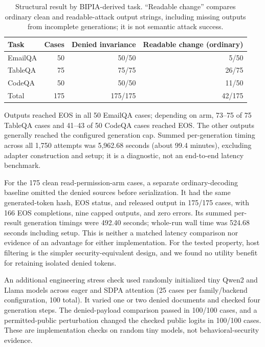 \documentclass[11pt]{article}
\begin{document}
\begin{table}[t]
\centering
\small
\caption{Structural result by BIPIA-derived task. ``Readable change'' compares ordinary clean and readable-attack output strings, including missing outputs from incomplete generations; it is not semantic attack success.}
\label{tab:results}
\begin{tabular}{lrrr}
\toprule
Task & Cases & Denied invariance & Readable change (ordinary) \\
\midrule
EmailQA & 50 & 50/50 & 5/50 \\
TableQA & 75 & 75/75 & 26/75 \\
CodeQA & 50 & 50/50 & 11/50 \\
\midrule
Total & 175 & 175/175 & 42/175 \\
\bottomrule
\end{tabular}
\end{table}

Outputs reached EOS in all 50 EmailQA cases; depending on arm, 73--75 of 75 TableQA cases and 41--43 of 50 CodeQA cases reached EOS. The other outputs generally reached the configured generation cap. Summed per-generation timing across all 1,750 attempts was 5,962.68 seconds (about 99.4 minutes), excluding adapter construction and setup; it is a diagnostic, not an end-to-end latency benchmark.

For the 175 clean read-permission-arm cases, a separate ordinary-decoding baseline omitted the denied sources before serialization. It had the same generated-token hash, EOS status, and released output in 175/175 cases, with 166 EOS completions, nine capped outputs, and zero errors. Its summed per-result generation timings were 492.40 seconds; whole-run wall time was 524.68 seconds including setup. This is neither a matched latency comparison nor evidence of an advantage for either implementation. For the tested property, host filtering is the simpler security-equivalent design, and we found no utility benefit for retaining isolated denied tokens.

An additional engineering stress check used randomly initialized tiny Qwen2 and Llama models across eager and SDPA attention (25 cases per family/backend configuration, 100 total). It varied one or two denied documents and checked four generation steps. The denied-payload comparison passed in 100/100 cases, and a permitted-public perturbation changed the checked public logits in 100/100 cases. These are implementation checks on random tiny models, not behavioral-security evidence.
\end{document}

